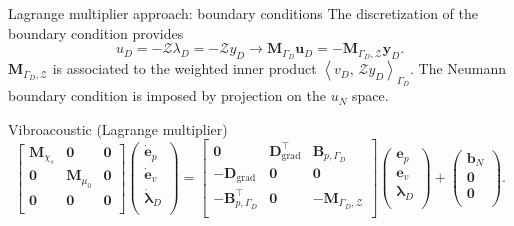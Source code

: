\documentclass[aspectratio=169]{ISAE-Beamer}
\DeclareMathOperator*{\grad}{grad}
\newcommand{\inner}[3][]{\ensuremath{\left\langle #2, \, #3 \right\rangle_{#1}}}
\begin{document}
\begin{frame}{Lagrange multiplier approach: boundary conditions}
The discretization of the boundary condition provides
\[ u_D=-\mathcal{Z}\lambda_D=-\mathcal{Z}y_D \longrightarrow \mathbf{M}_{\Gamma_D} \mathbf{u}_D = - \mathbf{M}_{\Gamma_D, \mathcal{Z}} {\mathbf{y}}_D.
\]
$\mathbf{M}_{\Gamma_D, \mathcal{Z}}$ is associated to the weighted inner product $\inner[\Gamma_D]{v_D}{\mathcal{Z} y_D}$. The Neumann boundary condition is imposed by projection on the $u_N$ space.   

\begin{block}{Vibroacoustic (Lagrange multiplier)}
\begin{equation*}
\begin{bmatrix}
\mathbf{M}_{\chi_s} & \mathbf{0} & \mathbf{0}\\
\mathbf{0} & \mathbf{M}_{\mu_0} & \mathbf{0} \\
\mathbf{0} & \mathbf{0} & \mathbf{0} \\
\end{bmatrix}
\begin{pmatrix}
\dot{\mathbf{e}}_p\\
\dot{\mathbf{e}}_v\\
\dot{\bm{\lambda}}_D \\
\end{pmatrix}
= \begin{bmatrix}
\mathbf{0} & \mathbf{D}_{\grad}^\top & \mathbf{B}_{p, \Gamma_D}\\
-\mathbf{D}_{\grad} & \mathbf{0} & \mathbf{0} \\
-\mathbf{B}_{p, \Gamma_D}^\top & \mathbf{0} & -\mathbf{M}_{\Gamma_D, \mathcal{Z}} \\
\end{bmatrix}
\begin{pmatrix}
{\mathbf{e}}_p\\
{\mathbf{e}}_v\\
{\bm{\lambda}}_D \\
\end{pmatrix} + \begin{pmatrix}
\mathbf{b}_N \\
\mathbf{0}\\
\mathbf{0}\\
\end{pmatrix}.
\end{equation*}
\end{block}

\end{frame}
\end{document}

